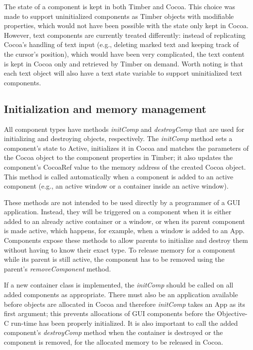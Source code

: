 \documentclass[a4paper]{article}
\begin{document}
The state of a component is kept in both Timber and Cocoa. This choice was made to support uninitialized components as Timber objects with modifiable properties, which would not have been possible with the state only kept in Cocoa. However, text components are currently treated differently: instead of replicating Cocoa's handling of text input (e.g., deleting marked text and keeping track of  the cursor's position), which would have been very complicated, the text content is kept in Cocoa only and retrieved by Timber on demand. Worth noting is that each text object will also have a text state variable to support uninitialized text components.

\subsection{Initialization and memory management}
All component types have methods \textit{initComp} and \textit{destroyComp}  that are used for initializing and destroying objects, respectively. The \textit{initComp} method sets a component's state to Active, initializes it in Cocoa and matches the parameters of the Cocoa object to the component properties in Timber; it also updates the component's CocoaRef value to the memory address of the created Cocoa object. This method is called automatically when a component is added to an active component (e.g., an active window or a container inside an active window). 

These methods are not intended to be used directly by a programmer of a GUI application. Instead, they will be triggered on a component when it is either added to an already active container or a window, or when its parent component is made active, which happens, for example, when a window is added to an App. Components expose these methods to allow parents to initialize and destroy them without having to know their exact type. To release memory for a component while its parent is still active, the component has to be removed using the parent's \textit{removeComponent} method.

If a new container class is implemented, the \textit{initComp} should be called on all added components as appropriate. There must also be an application available before objects are allocated in Cocoa and therefore \textit{initComp} takes  an App as its first argument; this prevents allocations of GUI components before the Objective-C run-time has been properly initialized.  It is also important to call the added component's \textit{destroyComp} method when the container is destroyed or the component is removed, for the allocated memory to be released in Cocoa. 
\end{document}
